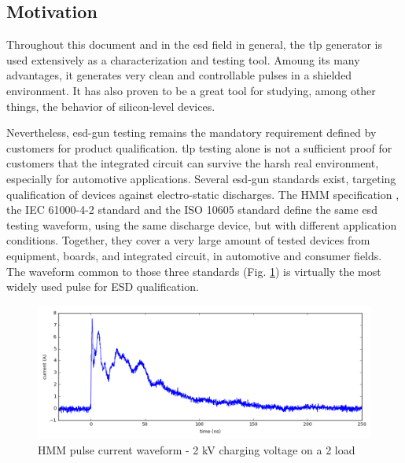 \subsection{Motivation}

Throughout this document and in the \gls{esd} field in general, the \gls{tlp} generator is used extensively as a characterization and testing tool.
Amoung its many advantages, it generates very clean and controllable pulses in a shielded environment.
It has also proven to be a great tool for studying, among other things, the behavior of silicon-level devices.

Nevertheless, \gls{esd-gun} testing remains the mandatory requirement defined by customers for product qualification.
\gls{tlp} testing alone is not a sufficient proof for customers that the integrated circuit can survive the harsh real environment, especially for automotive applications.
Several \gls{esd-gun} standards exist, targeting qualification of devices against electro-static discharges.
The HMM specification \cite{hmm}, the IEC 61000-4-2 standard \cite{iec61000-4-2} and the ISO 10605 standard \cite{iso10605} define the same \gls{esd} testing waveform, using the same discharge device, but with different application conditions.
Together, they cover a very large amount of tested devices from equipment, boards, and integrated circuit, in automotive and consumer fields.
The waveform common to those three standards (Fig. \ref{fig:hmm-waveform}) is virtually the most widely used pulse for ESD qualification.

\begin{figure}[!h]
  \centering
  \includegraphics[width=\textwidth]{src/5/figures/hmm_pulse.png}
  \caption{HMM pulse current waveform - 2 kV charging voltage on a 2\textOmega{} load}
  \label{fig:hmm-waveform}
\end{figure}

